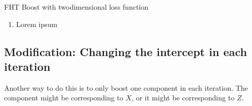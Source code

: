 \begin{algorithm}
\caption{FHT Boost with twodimensional loss function}
\label{algo:fhtboost}
\begin{enumerate}
    \item Lorem ipsum
\end{enumerate}
\end{algorithm}

\subsection{Modification: Changing the intercept in each iteration}
Another way to do this is to only boost one component in each iteration. The component might be corresponding to $X$, or it might be corresponding to $Z$.